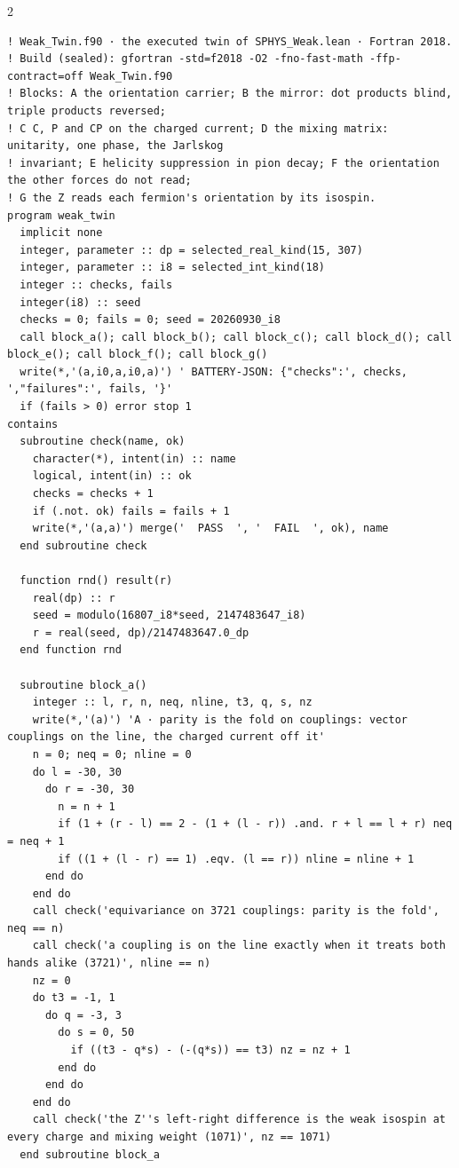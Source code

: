 \documentclass[10pt]{article}
\begin{document}
\begin{multicols}{2}
\begin{Verbatim}[fontsize=\fontsize{6.2}{7.2}\selectfont,breaklines,breakanywhere,breaksymbolleft={}]
! Weak_Twin.f90 · the executed twin of SPHYS_Weak.lean · Fortran 2018.
! Build (sealed): gfortran -std=f2018 -O2 -fno-fast-math -ffp-contract=off Weak_Twin.f90
! Blocks: A the orientation carrier; B the mirror: dot products blind, triple products reversed;
! C C, P and CP on the charged current; D the mixing matrix: unitarity, one phase, the Jarlskog
! invariant; E helicity suppression in pion decay; F the orientation the other forces do not read;
! G the Z reads each fermion's orientation by its isospin.
program weak_twin
  implicit none
  integer, parameter :: dp = selected_real_kind(15, 307)
  integer, parameter :: i8 = selected_int_kind(18)
  integer :: checks, fails
  integer(i8) :: seed
  checks = 0; fails = 0; seed = 20260930_i8
  call block_a(); call block_b(); call block_c(); call block_d(); call block_e(); call block_f(); call block_g()
  write(*,'(a,i0,a,i0,a)') ' BATTERY-JSON: {"checks":', checks, ',"failures":', fails, '}'
  if (fails > 0) error stop 1
contains
  subroutine check(name, ok)
    character(*), intent(in) :: name
    logical, intent(in) :: ok
    checks = checks + 1
    if (.not. ok) fails = fails + 1
    write(*,'(a,a)') merge('  PASS  ', '  FAIL  ', ok), name
  end subroutine check

  function rnd() result(r)
    real(dp) :: r
    seed = modulo(16807_i8*seed, 2147483647_i8)
    r = real(seed, dp)/2147483647.0_dp
  end function rnd

  subroutine block_a()
    integer :: l, r, n, neq, nline, t3, q, s, nz
    write(*,'(a)') 'A · parity is the fold on couplings: vector couplings on the line, the charged current off it'
    n = 0; neq = 0; nline = 0
    do l = -30, 30
      do r = -30, 30
        n = n + 1
        if (1 + (r - l) == 2 - (1 + (l - r)) .and. r + l == l + r) neq = neq + 1
        if ((1 + (l - r) == 1) .eqv. (l == r)) nline = nline + 1
      end do
    end do
    call check('equivariance on 3721 couplings: parity is the fold', neq == n)
    call check('a coupling is on the line exactly when it treats both hands alike (3721)', nline == n)
    nz = 0
    do t3 = -1, 1
      do q = -3, 3
        do s = 0, 50
          if ((t3 - q*s) - (-(q*s)) == t3) nz = nz + 1
        end do
      end do
    end do
    call check('the Z''s left-right difference is the weak isospin at every charge and mixing weight (1071)', nz == 1071)
  end subroutine block_a


\end{Verbatim}
\end{multicols}
\end{document}
